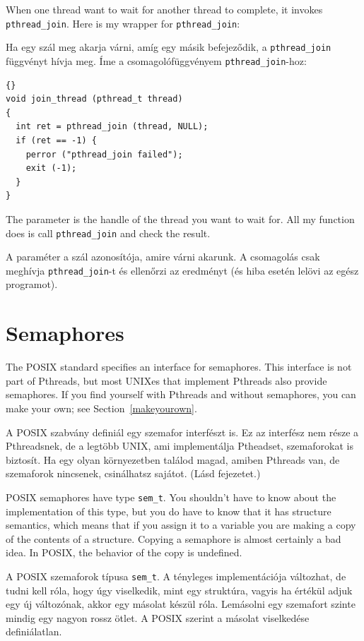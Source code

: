 \documentclass{book}
\begin{document}
When one thread want to wait for another thread to complete,
it invokes {\tt pthread\_join}.
Here is my wrapper for {\tt pthread\_join}:

Ha egy szál meg akarja várni, amíg egy másik befejeződik,
a {\tt pthread\_join} függvényt hívja meg. Íme a csomagolófüggvényem
{\tt pthread\_join}-hoz:

\begin{lstlisting}[title={}]{}
void join_thread (pthread_t thread)
{
  int ret = pthread_join (thread, NULL);
  if (ret == -1) {
    perror ("pthread_join failed");
    exit (-1);
  }
}
\end{lstlisting}

The parameter is the handle of the thread you want to wait for.
All my function does is call {\tt pthread\_join} and check the
result.

A paraméter a szál azonosítója, amire várni akarunk. A csomagolás
csak meghívja {\tt pthread\_join}-t és ellenőrzi az eredményt
(és hiba esetén lelövi az egész programot).




\section{Semaphores}

The POSIX standard specifies an interface for semaphores.
This interface is not part of Pthreads, but most UNIXes
that implement Pthreads also provide semaphores.  If you
find yourself with Pthreads and without semaphores, you
can make your own; see Section~\ref{makeyourown}.

A POSIX szabvány definiál egy szemafor interfészt is.
Ez az interfész nem része a Pthreadsnek, de a legtöbb UNIX,
ami implementálja Ptheadset, szemaforokat is biztosít.
Ha egy olyan környezetben találod magad, amiben Pthreads van,
de szemaforok nincsenek, csinálhatsz sajátot. (Lásd \az{\ref{makeyourown}}
fejezetet.)

POSIX semaphores have type {\tt sem\_t}.  You shouldn't have
to know about the implementation of this type, but you do
have to know that it has structure semantics, which means that
if you assign it to a variable you are making a copy of the
contents of a structure.  Copying a semaphore is almost certainly
a bad idea.  In POSIX, the behavior of the copy is undefined.

A POSIX szemaforok típusa {\tt sem\_t}. A tényleges implementációja
változhat, de tudni kell róla, hogy úgy viselkedik, mint egy
struktúra, vagyis ha értékül adjuk egy új változónak, akkor
egy másolat készül róla. Lemásolni egy szemafort szinte
mindig egy nagyon rossz ötlet. A POSIX szerint a másolat viselkedése
definiálatlan.
\end{document}
